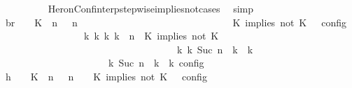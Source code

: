 \begin{isabellebody}
\ \ \ \ \ \ \ \ \isamarkupfalse%
\ HeronConf{\isacharunderscore}interp{\isacharunderscore}stepwise{\isacharunderscore}implies{\isacharunderscore}not{\isacharunderscore}cases\ \isamarkupfalse%
\ simp\isanewline
\ \ \ \ \ \ \isamarkupfalse%
\ \isamarkupfalse%
\ br{}{\isacharcolon}\ {\isacartoucheopen}{\isasymrho}\ {\isasymin}\ {\isasymlbrakk}\ {\isacharparenleft}{\isacharparenleft}K\ {\isasymnot}{\isasymUp}\ n{\isacharparenright}\ {\isacharhash}\ {\isasymGamma}{\isacharparenright}{\isacharcomma}\ n\isanewline
\ \ \ \ \ \ \ \ \ \ \ \ \ \ \ \ \ \ \ \ \ \ \ \ \ \ \ \ {\isasymturnstile}\ {\isasymPsi}\ {\isasymtriangleright}\ {\isacharparenleft}{\isacharparenleft}K\ implies\ not\ K\ {\isacharhash}\ {\isasymPhi}{\isacharparenright}\ {\isasymrbrakk}\isactrlsub c\isactrlsub o\isactrlsub n\isactrlsub f\isactrlsub i\isactrlsub g\isanewline
\ \ \ \ \ \ \ \ \ \ \ \ \ \ \ \ {\isasymLongrightarrow}\ {\isasymexists}{\isasymGamma}\isactrlsub k\ {\isasymPsi}\isactrlsub k\ {\isasymPhi}\isactrlsub k\ k{\isachardot}\ {\isacharparenleft}{\isacharparenleft}{\isasymGamma}{\isacharcomma}\ n\ {\isasymturnstile}\ {\isacharparenleft}{\isacharparenleft}K\ implies\ not\ K\ {\isacharhash}\ {\isasymPsi}{\isacharparenright}\ {\isasymtriangleright}\ {\isasymPhi}{\isacharparenright}\isanewline
\ \ \ \ \ \ \ \ \ \ \ \ \ \ \ \ \ \ \ \ \ \ \ \ \ \ \ \ \ \ \ \ \ \ \ \ {\isasymhookrightarrow}\isactrlbsup k\isactrlesup \ {\isacharparenleft}{\isasymGamma}\isactrlsub k{\isacharcomma}\ Suc\ n\ {\isasymturnstile}\ {\isasymPsi}\isactrlsub k\ {\isasymtriangleright}\ {\isasymPhi}\isactrlsub k{\isacharparenright}{\isacharparenright}\isanewline
\ \ \ \ \ \ \ \ \ \ \ \ \ \ \ \ \ \ {\isasymand}\ {\isasymrho}\ {\isasymin}\ {\isasymlbrakk}\ {\isasymGamma}\isactrlsub k{\isacharcomma}\ Suc\ n\ {\isasymturnstile}\ {\isasymPsi}\isactrlsub k\ {\isasymtriangleright}\ {\isasymPhi}\isactrlsub k\ {\isasymrbrakk}\isactrlsub c\isactrlsub o\isactrlsub n\isactrlsub f\isactrlsub i\isactrlsub g{\isacartoucheclose}\isanewline
\ \ \ \ \ \ \isamarkupfalse%
\ {\isacharminus}\isanewline
\ \ \ \ \ \ \ \ \isamarkupfalse%
\ h{}{\isacharcolon}\ {\isacartoucheopen}{\isasymrho}\ {\isasymin}\ {\isasymlbrakk}\ {\isacharparenleft}{\isacharparenleft}K\ {\isasymnot}{\isasymUp}\ n{\isacharparenright}\ {\isacharhash}\ {\isasymGamma}{\isacharparenright}{\isacharcomma}\ n\ {\isasymturnstile}\ {\isasymPsi}\ {\isasymtriangleright}\ {\isacharparenleft}{\isacharparenleft}K\ implies\ not\ K\ {\isacharhash}\ {\isasymPhi}{\isacharparenright}\ {\isasymrbrakk}\isactrlsub c\isactrlsub o\isactrlsub n\isactrlsub f\isactrlsub i\isactrlsub g{\isacartoucheclose}\isanewline

\end{isabellebody}
